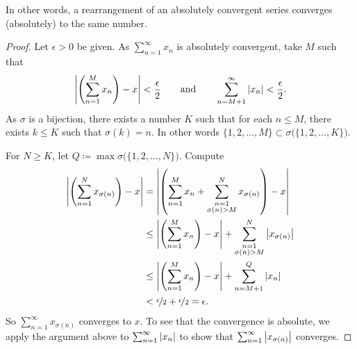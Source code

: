 In other words,
a rearrangement of an absolutely convergent series converges (absolutely)
to the same number.

\begin{proof}
Let $\epsilon > 0$ be given.  As $\sum_{n=1}^\infty x_n$ is absolutely convergent, take $M$ such that
\begin{equation*}
\left\lvert {\left(\sum_{n=1}^M x_n \right) - x} \right\rvert < \frac{\epsilon}{2}
\qquad \text{and} \qquad
\sum_{n=M+1}^\infty \left\lvert {x_n} \right\rvert < \frac{\epsilon}{2} .
\end{equation*}
As $\sigma$ is a bijection,
there exists a number $K$ such that for each
$n \leq M$, there exists $k \leq K$ such that $\sigma(k) = n$.
In other words
$\{ 1,2,\ldots,M \} \subset \sigma\bigl(\{ 1,2,\ldots,K \} \bigr)$.

For $N \geq K$, let $Q \coloneqq \max \sigma\bigl(\{ 1,2,\ldots,N \}\bigr)$.
Compute
\begin{equation*}
\begin{split}
\left\lvert {\left( \sum_{n=1}^N x_{\sigma(n)} \right) - x} \right\rvert
& =
\left\lvert { \left( \sum_{n=1}^M x_n
+
\sum_{\substack{n=1\\\sigma(n) > M}}^N x_{\sigma(n)} \right) - x} \right\rvert
\\
& \leq
\left\lvert { \left( \sum_{n=1}^M x_n \right) - x} \right\rvert
+
\sum_{\substack{n=1\\\sigma(n) > M}}^N \left\lvert {x_{\sigma(n)}} \right\rvert
\\
& \leq
\left\lvert { \left( \sum_{n=1}^M x_n \right) - x} \right\rvert
+
\sum_{n=M+1}^Q \left\lvert {x_{n}} \right\rvert
\\
& < \nicefrac{\epsilon}{2} + \nicefrac{\epsilon}{2} = \epsilon .
\end{split}
\end{equation*}
So 
$\sum_{n=1}^\infty x_{\sigma(n)}$ converges to $x$.  To see that the convergence
is absolute, we apply the argument above to $\sum_{n=1}^\infty \left\lvert {x_n} \right\rvert$ to show
that $\sum_{n=1}^\infty \left\lvert {x_{\sigma(n)}} \right\rvert$ converges.
\end{proof}

